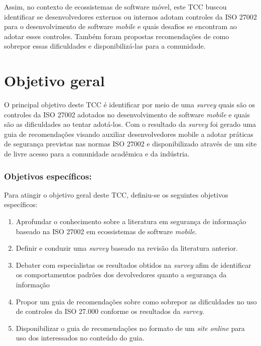 Assim, no contexto de ecossistemas de software móvel, este TCC  buscou identificar se desenvolvedores externos ou internos adotam controles da ISO 27002 para o desenvolvimento de software \textit{mobile} e quais desafios se encontram ao adotar esses controles. Também foram propostas recomendações de como sobrepor essas dificuldades e disponibilizá-las para a comunidade.



\section{Objetivo geral}

O principal objetivo deste TCC é identificar por meio de uma \textit{survey} quais são os controles da ISO 27002 adotados no desenvolvimento de software \textit{mobile} e quais são as dificuldades ao tentar adotá-los. Com o resultado da \textit{survey} foi gerado uma guia de recomendações visando auxiliar desenvolvedores mobile a adotar práticas de segurança previstas nas normas ISO 27002 e disponibilizado através de um site de livre acesso para a comunidade acadêmica e da indústria.
 
\subsubsection{\textbf{Objetivos específicos:}}

Para atingir o objetivo geral deste TCC, definiu-se os seguintes objetivos específicos:

\begin{enumerate}
    \item Aprofundar o conhecimento sobre a literatura em segurança de informação baseado na ISO 27002 em ecossistemas de software \textit{mobile}.
    
    \item Definir e conduzir uma \textit{survey} baseado na revisão da literatura anterior.
    
    \item Debater com especialistas os resultados obtidos na \textit{survey} afim de identificar os comportamentos padrões dos devolvedores quanto a segurança da informação
    
    \item Propor um guia de recomendações sobre como sobrepor as dificuldades no uso de controles da ISO 27.000 conforme os resultados da \textit{survey}.
    
    \item Disponibilizar o guia de recomendações no formato de um \textit{site online} para uso dos interessados no conteúdo do guia.
\end{enumerate}


